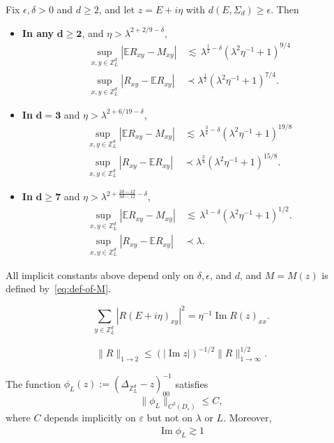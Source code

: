 \documentclass[10pt,a4paper]{amsart}
\def\Expec{{\mathbb E}}
\def\Z{{\mathbb{Z}}}
\def\bbZ{{\mathbb Z}}
\def\eps{{\varepsilon}}
\def\lsim{{\,\lesssim\,}}
\newcommand{\Impt}{\operatorname*{Im}}
\newcommand{\ldom}{\prec}
\begin{document}
\begin{theorem}
\label{thm:local-law}
Fix $\epsilon,\delta>0$ and $d\geq 2$, and let $z = E+i\eta$ with $d(E,\Sigma_d)\geq \epsilon$.
Then
\begin{itemize}
\item \textbf{In any} $\mathbf{d \geq 2}$,
and $\eta > \lambda^{2+2/9-\delta}$,
\begin{align*}
\sup_{x,y\in \Z^{d}_{L}}|\Expec R_{xy} - M_{xy}| &\lsim
\lambda^{\frac12-\delta} (\lambda^2\eta^{-1}+1)^{9/4} \\
\sup_{x,y\in \bbZ^{d}_{L}}|R_{xy} - \Expec R_{xy}| &\ldom \lambda^{\frac12} (\lambda^2\eta^{-1}+1)^{7/4}.
\end{align*}
\item \textbf{In} $\mathbf{d=3}$ and $\eta > \lambda^{2+6/19-\delta}$,
\begin{align*}
\sup_{x,y\in \Z^{d}_{L}}|\Expec R_{xy} - M_{xy}| &\lsim \lambda^{\frac34-\delta}
(\lambda^2\eta^{-1}+1)^{19/8} \\
\sup_{x,y\in \Z^{d}_{L}}|R_{xy}-\Expec R_{xy}| &\ldom \lambda^{\frac34}
(\lambda^2\eta^{-1}+1)^{15/8}.
\end{align*}
\item \textbf{In} $\mathbf{d\geq 7}$ and $\eta > \lambda^{2+\frac{2d-12}{3d-12} - \delta}$,
\begin{align*}
\sup_{x,y\in \Z^{d}_{L}}|\Expec R_{xy} - M_{xy}| &\lsim \lambda^{1-\delta} (\lambda^2 \eta^{-1}+1)^{1/2}.
\\
\sup_{x,y\in \Z^{d}_{L}}|R_{xy}-\Expec R_{xy}| &\ldom \lambda.
\end{align*}
\end{itemize}
All implicit constants above depend only on $\delta, \epsilon$, and $d$, and $M=M(z)$
is defined by~\eqref{eq:def-of-M}.
\end{theorem}

\begin{equation}
\label{eq:explicit-Ward}
\sum_{y\in \mathbb{Z}^d_L} |R(E+i\eta)_{xy}|^2 = \eta^{-1} \Impt R(z)_{xx}.
\end{equation}

\begin{align}\label{eq:2toInftyWard}
\|R\|_{1\to 2}\leq (|\Impt z|)^{- 1/2}\|R\|_{1\to \infty}^{1 /2}.
\end{align}

\begin{lemma}
\label{lem:dos-regularity}
The function $\phi_L(z) := (\Delta_{\bbZ^d_L}-z)^{-1}_{00}$ satisfies
\[
\|\phi_L\|_{C^2(D_\eps)} \leq C,
\]
where $C$ depends implicitly on $\eps$ but not on $\lambda$ or $L$.
Moreover,
\begin{align}\label{eq:diagonalResolventLowerBound}
	\Impt\phi_L\gtrsim 1
\end{align}
\end{lemma}
\end{document}
